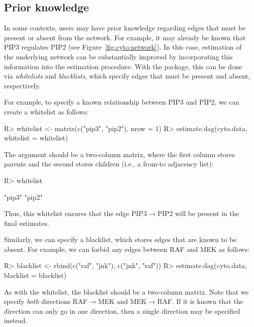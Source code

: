 \documentclass[article]{jss}
\renewcommand{\|}{\,|\,}
\begin{document}
\subsection{Prior knowledge}

In some contexts, users may have prior knowledge regarding edges that must be present or absent from the network. For example, it may already be known that PIP3 regulates PIP2 (see Figure~\ref{fig:cyto:network}). In this case, estimation of the underlying network can be substantially improved by incorporating this information into the estimation procedure. With the  package, this can be done via \emph{whitelists} and \emph{blacklists}, which specify edges that must be present and absent, respectively. 

For example, to specify a known relationship between PIP3 and PIP2, we can create a whitelist as follows:
%
\begin{CodeChunk}
\begin{CodeInput}
R> whitelist <- matrix(c("pip3", "pip2"), nrow = 1)
R> estimate.dag(cyto.data, whitelist = whitelist)
\end{CodeInput}
\end{CodeChunk}
%
The  argument should be a two-column matrix, where the first column stores parents and the second stores children (i.e., a from-to adjacency list):
%
\begin{CodeChunk}
\begin{CodeInput}
R> whitelist
\end{CodeInput}
\begin{CodeOutput}
     [,1]   [,2]  
[1,] "pip3" "pip2"
\end{CodeOutput}
\end{CodeChunk}
%
Thus, this whitelist ensures that the edge PIP3$\to$PIP2 will be present in the final estimates.

Similarly, we can specify a blacklist, which stores edges that are known to be absent. For example, we can forbid any edges between RAF and MEK as follows:
%
\begin{CodeChunk}
\begin{CodeInput}
R> blacklist <- rbind(c("raf", "jnk"), c("jnk", "raf"))
R> estimate.dag(cyto.data, blacklist = blacklist)
\end{CodeInput}
\end{CodeChunk}
%
As with the whitelist, the blacklist should be a two-column matrix. Note that we specify \emph{both} directions RAF$\to$MEK and MEK$\to$RAF. If it is known that the direction can only go in one direction, then a single direction may be specified instead.
\end{document}
